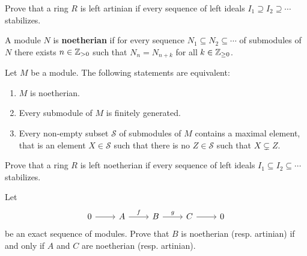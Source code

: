 \begin{exercise}
    Prove that a ring $R$ is left artinian if every sequence of 
    left ideals $I_1\supseteq I_2\supseteq\cdots$ stabilizes. 
\end{exercise}

A module $N$ is \textbf{noetherian} if for every sequence 
$N_1\subseteq N_2\subseteq\cdots$ of submodules of $N$ there exists $n\in\mathbb{Z}_{>0}$ such that 
$N_n=N_{n+k}$ for all $k\in\mathbb{Z}_{\geq0}$. 


\begin{exercise}
    Let $M$ be a module. The following statements are equivalent:
    \begin{enumerate}
        \item $M$ is noetherian.
        \item Every submodule of $M$ is finitely generated. 
        \item Every non-empty subset $\mathcal{S}$ of submodules of $M$ contains a maximal element, that is
            an element $X\in\mathcal{S}$ such that there is no $Z\in\mathcal{S}$ such that $X\subsetneq Z$.  
    \end{enumerate}
\end{exercise}

\begin{exercise}
    Prove that a ring $R$ is left noetherian if every sequence of 
    left ideals $I_1\subseteq I_2\subseteq\cdots$ stabilizes. 
\end{exercise}

\begin{exercise}
\label{xca:AN_exact}
	Let 
	\[
	\begin{tikzcd}
		0 \arrow{r}
		& A \arrow{r}{f}
		& B \arrow{r}{g}
		& C \arrow{r}
		& 0
	\end{tikzcd}
	\]
	be an exact sequence of modules. Prove that $B$ is noetherian (resp.
	artinian) if and only if $A$ and $C$ are noetherian (resp. artinian).
\end{exercise}


